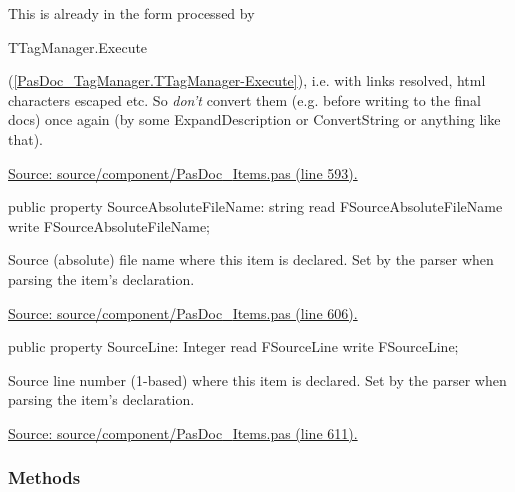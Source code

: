 \documentclass{report}
\newif\ifpdf
\begin{document}
\begin{list}{}
This is already in the form processed by \begin{ttfamily}TTagManager.Execute\end{ttfamily}(\ref{PasDoc_TagManager.TTagManager-Execute}), i.e. with links resolved, html characters escaped etc. So \textit{don't} convert them (e.g. before writing to the final docs) once again (by some ExpandDescription or ConvertString or anything like that).\par
\href{https://github.com/pasdoc/pasdoc/blob/master/source/component/PasDoc_Items.pas#L593}{Source: source/component/PasDoc{\_}Items.pas (line 593).}\label{PasDoc_Items.TPasItem-SourceAbsoluteFileName}
\item[\textbf{SourceAbsoluteFileName}\hfill]
\ifpdf
\begin{flushleft}
\fi
\begin{ttfamily}
public property SourceAbsoluteFileName: string
      read FSourceAbsoluteFileName write FSourceAbsoluteFileName;\end{ttfamily}

\ifpdf
\end{flushleft}
\fi


\par Source (absolute) file name where this item is declared. Set by the parser when parsing the item's declaration.\par
\href{https://github.com/pasdoc/pasdoc/blob/master/source/component/PasDoc_Items.pas#L606}{Source: source/component/PasDoc{\_}Items.pas (line 606).}\label{PasDoc_Items.TPasItem-SourceLine}
\item[\textbf{SourceLine}\hfill]
\ifpdf
\begin{flushleft}
\fi
\begin{ttfamily}
public property SourceLine: Integer read FSourceLine write FSourceLine;\end{ttfamily}

\ifpdf
\end{flushleft}
\fi


\par Source line number (1{-}based) where this item is declared. Set by the parser when parsing the item's declaration.\par
\href{https://github.com/pasdoc/pasdoc/blob/master/source/component/PasDoc_Items.pas#L611}{Source: source/component/PasDoc{\_}Items.pas (line 611).}\end{list}
\subsubsection*{\large{\textbf{Methods}}\normalsize\hspace{1ex}\hfill}
\end{document}
